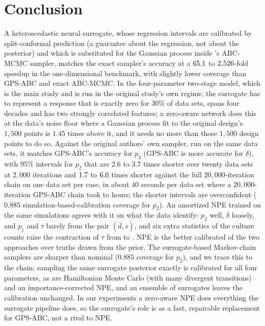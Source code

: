 \documentclass[sn-basic,iicol,pdflatex]{sn-jnl}
\begin{document}
\section{Conclusion}
\label{sec:conclusion}

A heteroscedastic neural surrogate, whose regression intervals are calibrated by split-conformal prediction (a guarantee about the regression, not about the posterior) and which is substituted for the Gaussian process inside
\citeauthor{lu2023}'s ABC-MCMC sampler, matches the exact sampler's accuracy at a $65.1$ to $2{,}526$-fold speedup in the one-dimensional benchmark, with slightly lower coverage than GPS-ABC and exact ABC-MCMC. In the four-parameter two-stage model, which is the main study and is run in the
original study's own regime, the surrogate has to represent a response that is exactly zero for $30\%$ of data sets, spans four
decades and has two strongly correlated features; a zero-aware network does this at the data's noise floor where a Gaussian
process fit to the original design's $1{,}500$ points is $1.45$ times above it, and it needs no more than those $1{,}500$ design points to do so. Against the original authors' own sampler, run on the same data sets, it matches GPS-ABC's accuracy for $p_2$ (GPS-ABC is more accurate for $\delta$), with $95\%$ intervals for $p_2$ that are $2.6$ to $3.7$ times shorter over twenty data sets at $2{,}000$ iterations and $1.7$ to $6.0$ times shorter against the full $20{,}000$-iteration chain on one data set per case, in about $40$ seconds per data set where a $20{,}000$-iteration GPS-ABC chain took \gtrCaseTwoHours{} to \gtrCaseOneHours{} hours; the shorter intervals are overconfident ($0.885$ simulation-based-calibration coverage for $p_2$).
An amortized NPE trained on the same simulations agrees with it on what the data identify: $p_2$ well, $\delta$ loosely, and $p_1$ and $\tau$ barely from the pair $(\bar d,s)$, and six extra statistics of the culture counts raise the contraction of $\tau$ from \psevenBaseTauContraction{} to \psevenExtrasTauContraction{}. NPE is the better calibrated of the two approaches over truths drawn from the prior. The surrogate-based
Markov-chain samplers are sharper than nominal ($0.885$ coverage for $p_2$), and we trace this to the chain: sampling the same surrogate posterior exactly is calibrated for all four parameters, as are Hamiltonian Monte Carlo (with many divergent transitions) and an importance-corrected NPE, and an ensemble of surrogates leaves the calibration unchanged. In our experiments a zero-aware NPE does everything the surrogate pipeline does, so the surrogate's role is as a fast, repairable replacement for GPS-ABC, not a rival to NPE.
\end{document}
